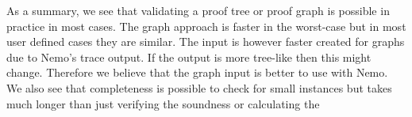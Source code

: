 As a summary, we see that validating a proof tree or proof graph is possible in practice in most cases. The graph approach is faster in the worst-case but in most user defined cases they are similar. The input is however faster created for graphs due to Nemo's trace output. If the output is more tree-like then this might change. Therefore we believe that the graph input is better to use with Nemo. We also see that completeness is possible to check for small instances but takes much longer than just verifying the soundness or calculating the 